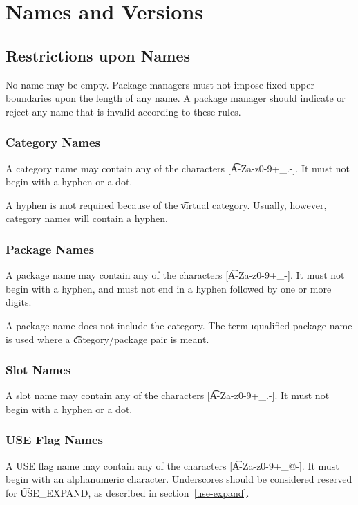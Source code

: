 \chapter{Names and Versions}

\section{Restrictions upon Names}

No name may be empty. Package managers must not impose fixed upper boundaries upon the length of any
name. A package manager should indicate or reject any name that is invalid according to these rules.

\subsection{Category Names}
A category name may contain any of the characters [\t{A-Za-z0-9+\_.-}]. It must not begin with
a hyphen or a dot.

\note A hyphen is \i{not} required because of the \t{virtual} category. Usually, however, category
names will contain a hyphen.

\subsection{Package Names}
A package name may contain any of the characters [\t{A-Za-z0-9+\_-}]. It must not begin with a
hyphen, and must not end in a hyphen followed by one or more digits.

\note A package name does not include the category. The term \i{qualified package name} is used
where a \t{category/package} pair is meant.

\subsection{Slot Names}
\label{sec:slot-names}
A slot name may contain any of the characters [\t{A-Za-z0-9+\_.-}]. It must not begin with a
hyphen or a dot.

\subsection{USE Flag Names}
A USE flag name may contain any of the characters [\t{A-Za-z0-9+\_@-}]. It must begin with an
alphanumeric character. Underscores should be considered reserved for \t{USE\_EXPAND}, as
described in section~\ref{use-expand}.

